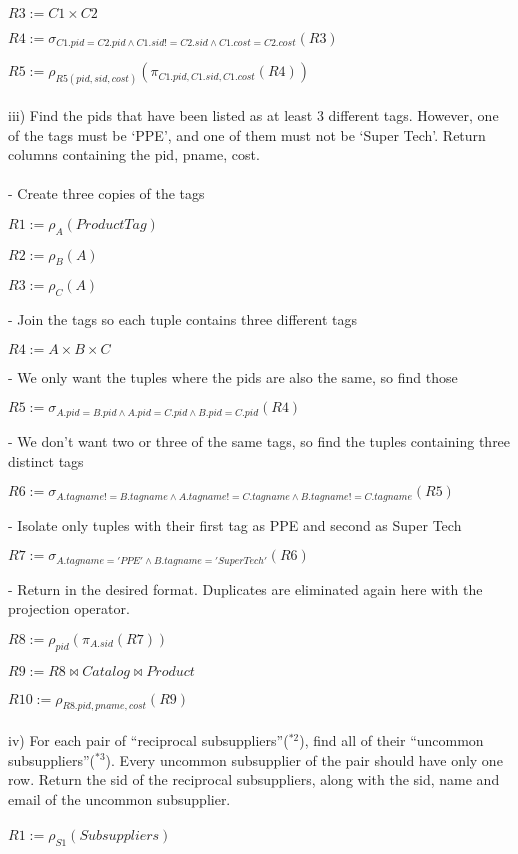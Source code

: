 \documentclass[10pt]{article}
\begin{document}
$R3 := C1 \times C2$

$R4 := \sigma_{C1.pid = C2.pid \wedge C1.sid != C2.sid \wedge C1.cost = C2.cost}(R3)$

$R5 := \rho_{R5(pid, sid, cost)}(\pi_{C1.pid, C1.sid, C1.cost}(R4))$
\\~\\
iii) Find the pids that have been listed as at least 3 different tags. However, one of the tags must be ‘PPE’, and one of them must not be ‘Super Tech’. Return columns containing the pid, pname, cost. 
\\~\\
- Create three copies of the tags

$R1 := \rho_{A}(ProductTag)$

$R2 := \rho_{B}(A)$

$R3 := \rho_{C}(A)$

- Join the tags so each tuple contains three different tags

$R4 := A \times B \times C$

- We only want the tuples where the pids are also the same, so find those

$R5 := \sigma_{A.pid = B.pid \wedge A.pid = C.pid \wedge B.pid = C.pid}(R4)$

- We don't want two or three of the same tags, so find the tuples containing three distinct tags

$R6 := \sigma_{A.tagname != B.tagname \wedge A.tagname != C.tagname \wedge B.tagname != C.tagname}(R5)$

- Isolate only tuples with their first tag as PPE and second as Super Tech

$R7 := \sigma_{A.tagname = 'PPE' \wedge B.tagname = 'Super Tech'}(R6)$

- Return in the desired format. Duplicates are eliminated again here with the projection operator.

$R8 := \rho_{pid}(\pi_{A.sid}(R7))$

$R9 := R8 \bowtie Catalog \bowtie Product$

$R10 := \rho_{R8.pid, pname, cost}(R9)$
\\~\\
iv) For each pair of “reciprocal subsuppliers”($^{*2}$), find all of their “uncommon subsuppliers”($^{*3}$). Every uncommon subsupplier of the pair should have only one row. Return the sid of the reciprocal subsuppliers, along with the sid, name and email of the uncommon subsupplier.
\\~\\
$R1 := \rho_{S1}(Subsuppliers)$
\end{document}
